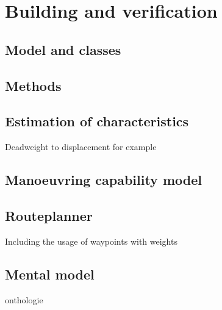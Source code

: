 \chapter{Building and verification}

\section{Model and classes}

\section{Methods}

\section{Estimation of characteristics}
Deadweight to displacement for example

\section{Manoeuvring capability model}

\section{Routeplanner}
Including the usage of waypoints with weights

\section{Mental model}
onthologie
